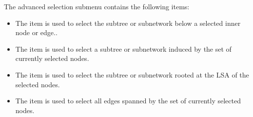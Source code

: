 \documentclass[11pt]{article}
\newcommand{\cs}[1]{\textcolor{red}{#1}}
\begin{document}
{\small
The advanced selection submenu contains the following items:
\begin{itemize}
\item The  item is used to select the subtree or subnetwork below a selected inner node or edge..
\item The  item is used to select a subtree or subnetwork induced by the set of currently selected nodes.
\item The  item is used to select the  subtree or subnetwork rooted at  the LSA of the selected nodes.
\item The  item is used to select all edges spanned by the set of currently selected nodes.%
\end{itemize}
}

\end{document}
